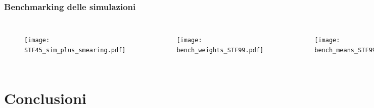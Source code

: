 \documentclass[10pt]{beamer}
\begin{document}
\begin{frame}
\frametitle{Benchmarking delle simulazioni}
\begin{columns}[t] %

\vspace*{-1.7cm}
\begin{figure}
\texttt{[image: STF45\_sim\_plus\_smearing.pdf]}
\end{figure}\vspace{-0.8cm}
\begin{figure}
\texttt{[image: bench\_weights\_STF99.pdf]}
\end{figure}



\vspace*{-0.8cm}

\begin{figure}
\texttt{[image: bench\_means\_STF99.pdf]}
\end{figure}\vspace{-0.7cm}

\begin{figure}
\texttt{[image: rrossi\_lossmap.pdf]}\\
\end{figure}\vspace{1cm}


\end{columns}
\end{frame}

\section{Conclusioni} 
\end{document}
